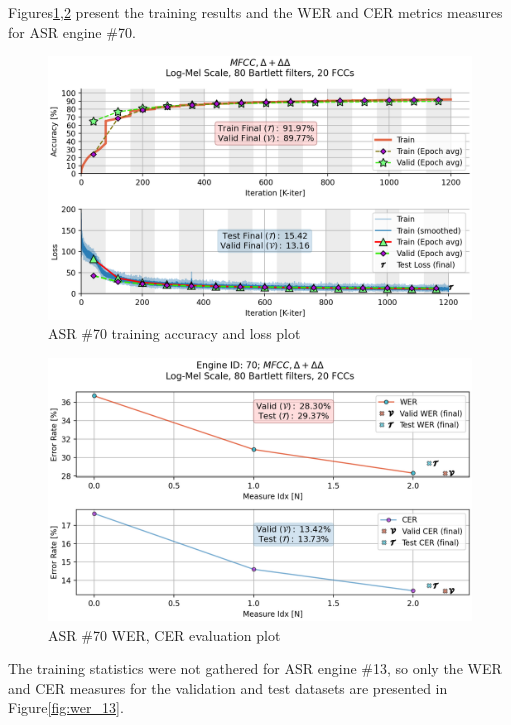 Figures\;\ref{fig:asr_70},\;\ref{fig:wer_70}
present the training results and the WER and CER
metrics measures for ASR engine \#70.

\begin{figure}[H]
    \centering
    \includegraphics[width=0.95\linewidth]{Experiments/images/asr_70}
    \caption{ASR \#70 training accuracy and loss plot}\label{fig:asr_70}
\end{figure}

\begin{figure}[H]
    \centering
    \includegraphics[width=0.95\linewidth]{ASR/images/asr70_wer.png}
    \caption{ASR \#70 WER, CER evaluation plot}\label{fig:wer_70}
\end{figure}

The training statistics were not gathered for ASR engine \#13,
so only the WER and CER measures for the validation
and test datasets are presented in Figure\;\ref{fig:wer_13}.


